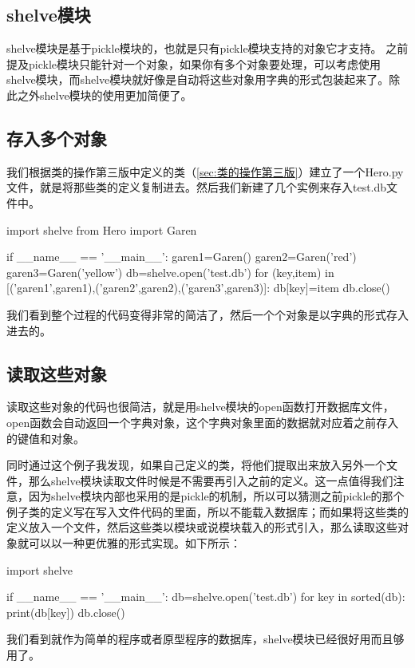 \documentclass[12pt,oneside]{book}
\begin{document}
\begin{common-format}
\chapter{shelve模块}
shelve模块是基于pickle模块的，也就是只有pickle模块支持的对象它才支持。 之前提及pickle模块只能针对一个对象，如果你有多个对象要处理，可以考虑使用shelve模块，而shelve模块就好像是自动将这些对象用字典的形式包装起来了。除此之外shelve模块的使用更加简便了。

\section{存入多个对象}
我们根据类的操作第三版中定义的类（\ref{sec:类的操作第三版}）建立了一个Hero.py文件，就是将那些类的定义复制进去。然后我们新建了几个实例来存入test.db文件中。

\begin{tcbpython}
import shelve
from Hero import Garen

if __name__ == '__main__':
    garen1=Garen()
    garen2=Garen('red')
    garen3=Garen('yellow')
    db=shelve.open('test.db')
    for (key,item) in [('garen1',garen1),('garen2',garen2),('garen3',garen3)]:
        db[key]=item
    db.close()
\end{tcbpython}

我们看到整个过程的代码变得非常的简洁了，然后一个个对象是以字典的形式存入进去的。

\section{读取这些对象}
读取这些对象的代码也很简洁，就是用shelve模块的open函数打开数据库文件，open函数会自动返回一个字典对象，这个字典对象里面的数据就对应着之前存入的键值和对象。

同时通过这个例子我发现，如果自己定义的类，将他们提取出来放入另外一个文件，那么shelve模块读取文件时候是不需要再引入之前的定义。这一点值得我们注意，因为shelve模块内部也采用的是pickle的机制，所以可以猜测之前pickle的那个例子类的定义写在写入文件代码的里面，所以不能载入数据库；而如果将这些类的定义放入一个文件，然后这些类以模块或说模块载入的形式引入，那么读取这些对象就可以以一种更优雅的形式实现。如下所示：
\begin{tcbpython}
import shelve

if __name__ == '__main__':
    db=shelve.open('test.db')
    for key in sorted(db):
        print(db[key])
    db.close()
\end{tcbpython}

我们看到就作为简单的程序或者原型程序的数据库，shelve模块已经很好用而且够用了。



\end{common-format}
\end{document}

